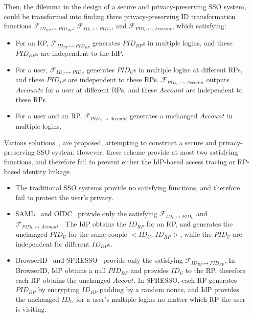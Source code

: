 Then, the dilemma in the design of a secure and privacy-preserving SSO system, could be transformed into finding three  privacy-preserving ID transformation functions  $\mathcal{F}_{ID_{RP} \mapsto PID_{RP}}$, $\mathcal{F}_{ID_{U} \mapsto PID_{U}}$,  and $\mathcal{F}_{PID_{U} \mapsto Account}$, which satisfying:
\begin{itemize}
  \item For an RP, $\mathcal{F}_{ID_{RP} \mapsto PID_{RP}}$ generates $PID_{RP}$s in multiple logins, and these  $PID_{RP}$s are independent to the IdP.
  \item For a user, $\mathcal{F}_{ID_{U} \mapsto PID_{U}}$ generates $PID_{U}$s in multiple logins at different RPs, and these $PID_{U}$s are independent to these RPs. $\mathcal{F}_{PID_{U} \mapsto Account}$ outputs $Account$s for a user at different RPs, and these $Account$ are independent to these RPs.
  \item For a user and an RP, $\mathcal{F}_{PID_{U} \mapsto Account}$ generates a unchanged $Account$ in multiple logins.
\end{itemize}

Various solutions~\cite{OpenIDConnect, SAMLIdentifier,BrowserID,SPRESSO}, are proposed, attempting to construct a secure and privacy-preserving SSO system.
However, these scheme provide at most two satisfying functions, and therefore fail to prevent either the IdP-based access tracing or RP-based identity linkage.
\begin{itemize}
  \item The traditional SSO systems provide no satisfying functions, and therefore fail to protect the user's privacy.
  \item SAML~\cite{SAMLIdentifier} and OIDC~\cite{OpenIDConnect} provide only the satisfying $\mathcal{F}_{ID_{U} \mapsto PID_{U}}$ and $\mathcal{F}_{PID_{U} \mapsto Account}$ .
        The IdP obtains the $ID_{RP}$ for an RP, and generates the unchanged $PID_{U}$ for the same couple $<ID_{U}$, $ID_{RP}>$,
        while the $PID_{U}$ are independent for different $ID_{RP}$s.
  \item BrowserID~\cite{BrowserID} and SPRESSO~\cite{SPRESSO} provide only the satisfying $\mathcal{F}_{ID_{RP} \mapsto PID_{RP}}$.
        In BrowserID, IdP obtains a null $PID_{RP}$ and provides $ID_U$ to the RP, therefore each RP obtains the unchanged $Accout$.
        In SPRESSO, each RP generates $PID_{RP}$ by encrypting $ID_{RP}$ padding by a random nonce,
        and IdP provides the unchanged $ID_U$ for a user's multiple logins no matter which RP the user is visiting.
\end{itemize}

